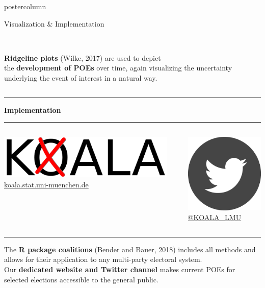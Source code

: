 \documentclass[final,hyperref={pdfpagelabels=false}]{beamer}
\newcommand{\bfBlue}[1]{\textcolor{koaladarkestblue}{\textbf{#1}}}
\newcommand{\blue}[1]{\textcolor{koaladarkestblue}{#1}}
\newcommand{\darkgray}[1]{\textcolor{koaladarkgray}{#1}}
\begin{document}
\begin{frame}
\begin{columns}
\begin{column}{1\textwidth}
\begin{columns}[T]
\begin{column}{.484\textwidth}
\begin{beamercolorbox}[center,wd=\textwidth]{postercolumn}
\begin{minipage}[T]{.95\textwidth}
\begin{block}{\footnotesize Visualization \& Implementation}
\begin{columns}[t]
  \begin{column}{.6\textwidth}
  \ \\[70px]
  \darkgray{\textbf{Ridgeline plots}} {\footnotesize (Wilke, 2017)} are used to depict \\
  the \darkgray{\textbf{development of POEs}} over time, again visualizing the uncertainty 
  underlying the event of interest in a natural way.
  \end{column}
\end{columns}
\vspace{1ex}
\textcolor{LMUlightgray}{\hrule{}}
\vspace{48px}
\bfBlue{Implementation}
\\[0.05cm]
\textcolor{LMUlightgray}{\hrule{}}
\vspace{1ex}
\begin{columns}[t]
  \begin{column}{.45\textwidth}
  \begin{center}\centering
  \includegraphics[height=3.5ex]{figures/Koala_Logo_ohneSchrift} \\
  \blue{\footnotesize \href{http://koala.stat.uni-muenchen.de}{koala.stat.uni-muenchen.de}}
  \end{center}
  \end{column}

  \hspace{-1.5ex}
  \textcolor{LMUlightgray}{\vrule{}}
  \hspace{1.5ex}

  \begin{column}{.45\textwidth}
  \begin{center}\centering
  \includegraphics[height=3.5ex]{figures/implementation_twitter} \\
  \blue{\footnotesize \href{https://twitter.com/KOALA_LMU}{@KOALA\_LMU}}
  \end{center}
  \end{column}
\end{columns}
\vspace{1ex}
\textcolor{LMUlightgray}{\hrule{}}
\vspace{3ex}

The \darkgray{\textbf{R package coalitions}} {\footnotesize (Bender and Bauer, 2018)}
includes all methods and allows for their application to any multi-party electoral system.
\\[0.75cm]
Our \darkgray{\textbf{dedicated website and Twitter channel}} makes current POEs
for selected elections accessible to the general public.


\end{block}
\end{minipage}
\end{beamercolorbox}
\end{column}
\end{columns}
\end{column}
\end{columns}
\end{frame}
\end{document}

